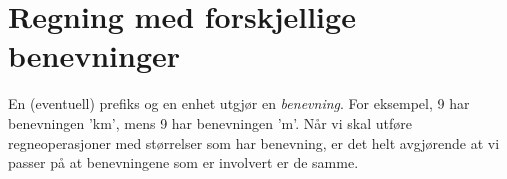 \section{Regning med forskjellige benevninger \label{regnmforbenvn}}
En (eventuell) prefiks og en enhet utgjør en \textit{benevning}. For eksempel, 9 har benevningen 'km', mens 9 har benevningen 'm'. Når vi skal utføre regneoperasjoner med størrelser som har benevning, er det helt avgjørende at vi passer på at benevningene som er involvert er de samme.

